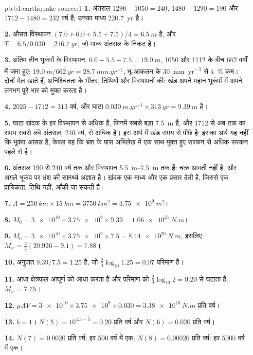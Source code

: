\begin{solution}{pb:b1:earthquake-source:1}
\textbf{1.} अंतराल $1290 - 1050 = 240$, $1480 - 1290 = 190$ और
$1712 - 1480 = 232$ वर्ष हैं; उनका माध्य \qty{220.7}{yr} है।

\textbf{2.} औसत विस्थापन $(7.0 + 6.0 + 5.5 + 7.5)/4 = \qty{6.5}{m}$ है, और
$T = 6.5/0.030 = \qty{216.7}{yr}$, जो माध्य अंतराल के निकट है।

\textbf{3.} अंतिम तीन भूकंपों के विस्थापन, $6.0 + 5.5 + 7.5 =
\qty{19.0}{m}$, 1050 और 1712 के बीच 662 वर्षों में जमा हुए: $\qty{19.0}{m}
/\qty{662}{yr} = \qty{28.7}{mm.yr^{-1}}$, भू-आकलन के \qty{30}{mm.yr^{-1}} से \qty{4}{\percent} कम। दोनों मेल खाते हैं, अनिश्चितता के भीतर, तिथियों और विस्थापनों की: खंड अपने महान भूकंपों में अपने लगभग पूरे भार को मुक्त करता है।

\textbf{4.} $2025 - 1712 = 313$ वर्ष, और घाटा
$\qty{0.030}{m.yr^{-1}}\times\qty{313}{yr} = \qty{9.39}{m}$ है।

\textbf{5.} घाटा खंदक के हर विस्थापन से अधिक है, जिनमें सबसे बड़ा
\qty{7.5}{m} है, और 1712 से अब तक का समय सबसे लंबे अंतराल, 240 वर्ष, से अधिक है। इस अर्थ में खंड समय से पीछे है; इसका अर्थ यह नहीं कि भूकंप आसन्न है, केवल यह कि भ्रंश के पास अभिलेख में एक साथ मुक्त हुए सरकन से अधिक सरकन पहले से है।

\textbf{6.} अंतराल 190 से 240 वर्ष तक और विस्थापन \qtyrange{5.5}{7.5}{m} तक हैं: चक्र आवर्ती नहीं है, और अगले भूकंप पर भ्रंश की सामर्थ्य अज्ञात है। खंदक एक माध्य और एक प्रसार देती है, जिससे एक प्रायिकता, तिथि नहीं, आँकी जा सकती है।

\textbf{7.} $A = \qty{250}{km}\times\qty{15}{km} = \qty{3750}{km^2} =
\qty{3.75e9}{m^2}$।

\textbf{8.} $M_0 = \num{3e10}\times\num{3.75e9}\times\num{9.39} =
\qty{1.06e21}{N.m}$।

\textbf{9.} $M_0 = \num{3e10}\times\num{3.75e9}\times\num{7.5} =
\qty{8.44e20}{N.m}$, इसलिए $M_w = \tfrac23(20.926 - 9.1) = 7.88$।

\textbf{10.} अनुपात $9.39/7.5 = 1.25$ है, जो $\tfrac23\log_{10}1.25 =
0.07$ परिमाण है।

\textbf{11.} आधा क्षेत्रफल आघूर्ण को आधा करता है और परिमाण को
$\tfrac23\log_{10}2 = 0.20$ से घटाता है: $M_w = 7.75$।

\textbf{12.} $\mu A V = \num{3e10}\times\num{3.75e9}\times\num{0.030} =
\qty{3.38e18}{N.m}$ प्रति वर्ष।

\textbf{13.} $b = 1$। $N(5) = 10^{4.3 - 5} = 0.20$ प्रति वर्ष और $N(6) = 0.020$ प्रति
वर्ष।

\textbf{14.} $N(7) = 0.0020$ प्रति वर्ष: हर 500 वर्ष में एक; $N(8) = 0.00020$ प्रति
वर्ष: हर \num{5000} वर्ष में एक।


\end{solution}
